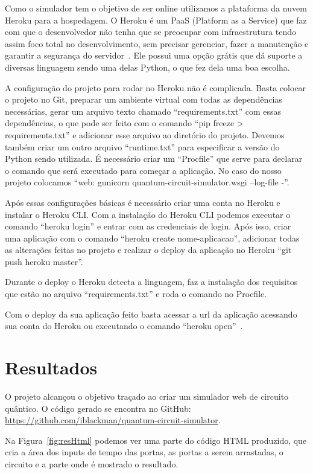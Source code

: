 \documentclass[a4paper, 12pt, oneside]{book}
\begin{document}
Como o simulador tem o objetivo de ser online utilizamos a plataforma da nuvem Heroku para a hospedagem. O Heroku é um PaaS (Platform as a Service) que faz com que o desenvolvedor não tenha que se preocupar com infraestrutura tendo assim foco total no desenvolvimento, sem precisar gerenciar, fazer a manutenção e garantir a segurança do servidor~\cite{heroku}. Ele possui uma opção grátis que dá suporte a diversas linguagem sendo uma delas Python, o que fez dela uma boa escolha.

A configuração do projeto para rodar no Heroku não é complicada. Basta colocar o projeto no Git, preparar um ambiente virtual com todas as dependências necessárias, gerar um arquivo texto chamado ``requirements.txt'' com essas dependências, o que pode ser feito com o comando ``pip freeze > requirements.txt'' e adicionar esse arquivo ao diretório do projeto. Devemos também criar um outro arquivo ``runtime.txt'' para especificar a versão do Python sendo utilizada. É necessário criar um ``Procfile'' que serve para declarar o comando que será executado para começar a aplicação. No caso do nosso projeto colocamos ``web: gunicorn quantum-circuit-simulator.wsgi --log-file -''.

Após essas configurações básicas é necessário criar uma conta no Heroku e instalar o Heroku CLI. Com a instalação do Heroku CLI podemos executar o comando ``heroku login'' e entrar com as credenciais de login. Após isso, criar uma aplicação com o comando ``heroku create nome-aplicacao'', adicionar todas as alterações feitas no projeto e realizar o deploy da aplicação no Heroku ``git push heroku master''.

Durante o deploy o Heroku detecta a linguagem, faz a instalação dos requisitos que estão no arquivo ``requirements.txt'' e roda o comando no Procfile.

Com o deploy da sua aplicação feito basta acessar a url da aplicação acessando sua conta do Heroku ou executando o comando ``heroku open''~\cite{heroku-python}.

\section{Resultados}

O projeto alcançou o objetivo traçado ao criar um simulador web de circuito quântico. O código gerado se encontra no GitHub: \url{https://github.com/iblackman/quantum-circuit-simulator}.

Na Figura~\ref{fig:resHtml} podemos ver uma parte do código HTML produzido, que cria a área dos inputs de tempo das portas, as portas a serem arrastadas, o circuito e a parte onde é mostrado o resultado.
\end{document}
